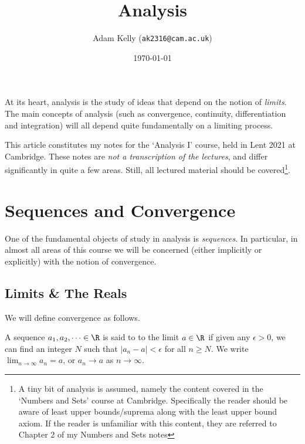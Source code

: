 \documentclass[a4paper]{scrartcl}
\title{Analysis}
\author{Adam Kelly (\texttt{ak2316@cam.ac.uk})}
\date{\today}
\begin{document}
\maketitle

At its heart, analysis is the study of ideas that depend on the notion of \emph{limits}.
The main concepts of analysis (such as convergence, continuity, differentiation and integration) will all depend quite fundamentally on a limiting process.

This article constitutes my notes for the `Analysis I' course, held in Lent 2021 at Cambridge. These notes are \emph{not a transcription of the lectures}, and differ significantly in quite a few areas. Still, all lectured material should be covered\footnote{A tiny bit of analysis is assumed, namely the content covered in the `Numbers and Sets' course at Cambridge. Specifically the reader should be aware of least upper bounds/suprema along with the least upper bound axiom. If the reader is unfamiliar with this content, they are referred to Chapter 2 of my Numbers and Sets notes}. 



\tableofcontents


\section{Sequences and Convergence} \label{sec:1.1}

One of the fundamental objects of study in analysis is \emph{sequences}. In particular, in almost all areas of this course we will be concerned (either implicitly or explicitly) with the notion of convergence.

\subsection{Limits \& The Reals}

We will define convergence as follows.

\begin{definition}[Convergence]
	A sequence $a_1, a_2, \dots \in \R$ is said to  to the limit $a \in \R$ if given any $\epsilon > 0$, we can find an integer $N$ such that $|a_n - a| < \epsilon$ for all $n \geq N$. We write $\displaystyle\lim_{n \to \infty}a_n = a$, or $a_n \rightarrow a$ as $n \rightarrow \infty$.
\end{definition}
\end{document}
